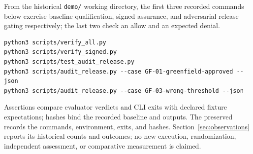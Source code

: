 \documentclass[11pt,a4paper]{article}
\begin{document}
From the historical \texttt{demo/} working directory, the first three recorded commands below exercise baseline qualification, signed assurance, and adversarial release gating respectively; the last two check an allow and an expected denial.
\begin{lstlisting}
python3 scripts/verify_all.py
python3 scripts/verify_signed.py
python3 scripts/test_audit_release.py
python3 scripts/audit_release.py --case GF-01-greenfield-approved --json
python3 scripts/audit_release.py --case GF-03-wrong-threshold --json
\end{lstlisting}
Assertions compare evaluator verdicts and CLI exits with declared fixture expectations; hashes bind the recorded baseline and outputs. The preserved  records the commands, environment, exits, and hashes. Section~\ref{sec:observations} reports its historical counts and outcomes; no new execution, randomization, independent assessment, or comparative measurement is claimed.
\end{document}

